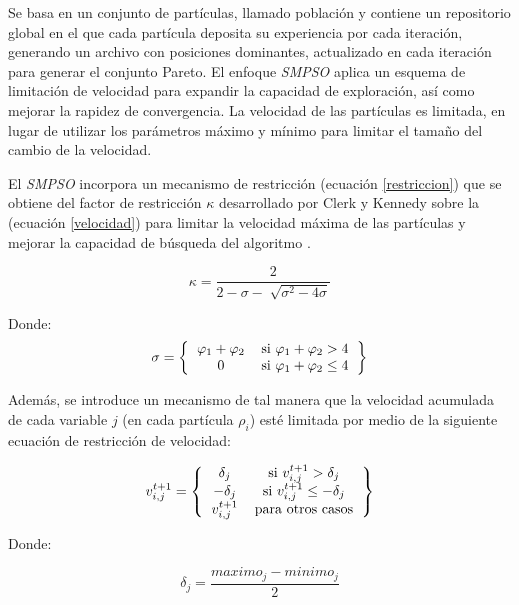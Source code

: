 Se basa en un conjunto de partículas, llamado población y contiene un repositorio global en el que cada partícula deposita su experiencia por cada iteración, generando un archivo con posiciones dominantes, actualizado en cada iteración para generar el conjunto Pareto. El enfoque \textit{SMPSO} aplica un esquema de limitación de velocidad para expandir la capacidad de exploración, así como mejorar la rapidez de convergencia. La velocidad de las partículas es limitada, en lugar de utilizar los parámetros máximo y mínimo para limitar el tamaño del cambio de la velocidad.  \cite{daumasjara}

El \textit{SMPSO} incorpora un mecanismo de restricción (ecuación \ref{restriccion}) que se obtiene del factor de restricción $\kappa$ desarrollado por Clerk y Kennedy sobre la (ecuación \ref{velocidad}) para limitar la velocidad máxima de las partículas y mejorar la capacidad de búsqueda del algoritmo \cite{smpso}.

\begin{equation}\label{restriccion}
    \kappa   = \frac{2}{2 - \sigma - \sqrt[]{ \sigma^2 - 4 \sigma}}
\end{equation}

Donde:
\begin{equation}\label{phi}
 \sigma = \left\{{\begin{tabular}{cc}
  $\varphi_1 +  \varphi_2$ & si $\varphi_1 +  \varphi_2 > 4$ \\
  $0$         & si $\varphi_1 +  \varphi_2 \leq 4$
  \end{tabular}}\right\}
\end{equation}

Además, se introduce un mecanismo de tal manera que la velocidad acumulada de cada variable $j$ (en cada partícula $\rho_i$) esté limitada por medio de la siguiente ecuación de restricción de velocidad:

\begin{equation}\label{velocidad_limitada}
 v^{t+1}_{i,j} = \left\{{\begin{tabular}{cc}
  $\delta_j$ & si $ v^{t+1}_{i,j} > \delta_j$ \\
  $-\delta_j$ & si $ v^{t+1}_{i,j} \leq - \delta_j$ \\
  $ v^{t+1}_{i,j}$ & para otros casos
  \end{tabular}}\right\}
\end{equation}

Donde:

\begin{equation}\label{delta}
\delta_j = \frac{maximo_j - minimo_j}{2}
\end{equation}

